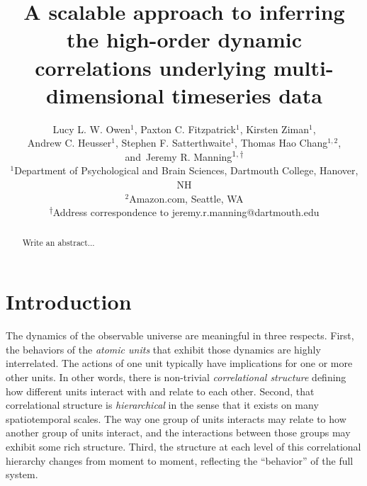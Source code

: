 \documentclass[english]{article}
\begin{document}
\title{A scalable approach to inferring the high-order dynamic correlations underlying multi-dimensional timeseries data}
\author{Lucy L. W. Owen$^1$,
Paxton C. Fitzpatrick$^1$,
Kirsten Ziman$^1$,\\
Andrew C. Heusser$^1$,
Stephen F. Satterthwaite$^1$,
Thomas Hao Chang$^{1,2}$,
and\
Jeremy R. Manning\textsuperscript{$1, \dagger$}\\
[0.1in]$^1$Department of Psychological and Brain Sciences, Dartmouth College, Hanover, NH\\
$^2$Amazon.com, Seattle, WA\\
\textsuperscript{$\dagger$}Address correspondence to jeremy.r.manning@dartmouth.edu}

\begin{titlepage}
\thispagestyle{fancy}   




\end{titlepage}




\maketitle


\begin{abstract}
Write an abstract...

\end{abstract}

\doublespacing

\section*{Introduction}
The dynamics of the observable universe are meaningful in three respects.  First, the behaviors of the \textit{atomic units} that exhibit those dynamics are highly interrelated.  The actions of one unit typically have implications for one or more other units.  In other words, there is non-trivial \textit{correlational structure} defining how different units interact with and relate to each other.  Second, that correlational structure is \textit{hierarchical} in the sense that it exists on many spatiotemporal scales.  The way one group of units interacts may relate to how another group of units interact, and the interactions between those groups may exhibit some rich structure.  Third, the structure at each level of this correlational hierarchy changes from moment to moment, reflecting the ``behavior'' of the full system.
\end{document}
